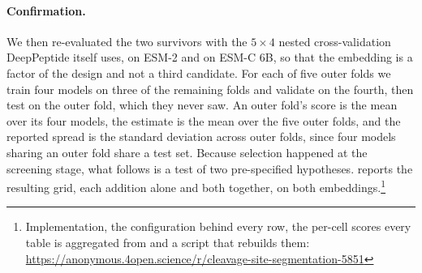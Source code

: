 \documentclass{article}
\begin{document}
\paragraph{Confirmation.}
\label{sec:eval-protocol}
We then re-evaluated the two survivors with the $5\times4$ nested cross-validation
DeepPeptide itself uses, on ESM-2 and on ESM-C 6B, so that the embedding is a
factor of the design and not a third candidate. For each of five outer folds we
train four models on three of the remaining folds and validate on the fourth,
then test on the outer fold, which they never saw. An outer fold's score is the
mean over its four models, the estimate is the mean over the five outer folds,
and the reported spread is the standard deviation across outer folds,
since four models sharing an outer fold share a test set.
Because selection happened at the screening stage, what follows is a test of two
pre-specified hypotheses.  reports the resulting grid, each
addition alone and both together, on both embeddings.\footnote{Implementation, the configuration behind every row, the per-cell scores every table is aggregated from and a script that rebuilds them: \url{https://anonymous.4open.science/r/cleavage-site-segmentation-5851}}
\end{document}
